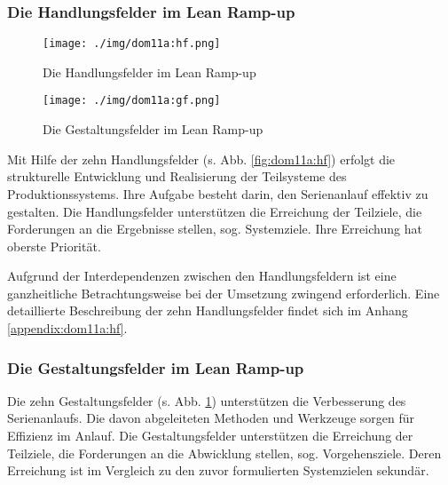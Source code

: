 \subsubsection{Die Handlungsfelder im Lean Ramp-up}\label{sec:dom11a:hf}
\begin{figure}[!ht] 
    \begin{minipage}{0.45\linewidth} 
    \begin{center}
 \texttt{[image: ./img/dom11a:hf.png]}
 \caption[Die Handlungsfelder im Lean Ramp-up]{Die Handlungsfelder im Lean Ramp-up \autocite{Dombrowski2011a}}\label{fig:dom11a:hf}
\end{center}
    \end{minipage} 
    \hfill 
    \begin{minipage}{0.5\linewidth} 
 \texttt{[image: ./img/dom11a:gf.png]}
 \caption[Die Gestaltungsfelder im Lean Ramp-up]{Die Gestaltungsfelder im Lean Ramp-up \autocite{Dombrowski2011a}}\label{fig:dom11a:gf}
    \end{minipage} 
  \end{figure} 

Mit Hilfe der zehn Handlungsfelder (s. Abb. \ref{fig:dom11a:hf}) erfolgt die strukturelle Entwicklung und Realisierung der Teilsysteme des Produktionssystems. Ihre Aufgabe besteht darin, den Serienanlauf effektiv zu gestalten. Die Handlungsfelder unterstützen die Erreichung der Teilziele, die Forderungen an die Ergebnisse stellen, sog. Systemziele. Ihre Erreichung hat oberste Priorität. 

Aufgrund der Interdependenzen zwischen den Handlungsfeldern ist eine ganzheitliche Betrachtungsweise bei der Umsetzung zwingend erforderlich. 
Eine detaillierte Beschreibung der zehn Handlungsfelder findet sich im Anhang \ref{appendix:dom11a:hf}. 

  
\subsubsection{Die Gestaltungsfelder im Lean Ramp-up}\label{sec:dom11a:gf}
Die zehn Gestaltungsfelder (s. Abb. \ref{fig:dom11a:gf}) unterstützen die Verbesserung des Serienanlaufs. Die davon abgeleiteten Methoden und Werkzeuge sorgen für Effizienz im Anlauf. Die Gestaltungsfelder unterstützen die Erreichung der Teilziele, die Forderungen an die Abwicklung stellen, sog. Vorgehensziele. Deren Erreichung ist im Vergleich zu den zuvor formulierten Systemzielen sekundär. 

